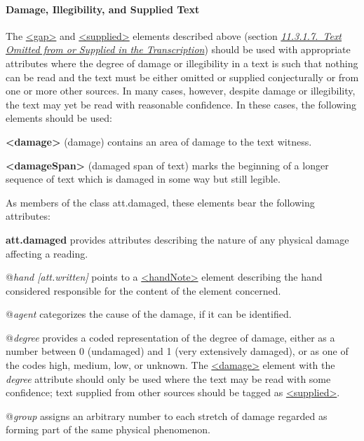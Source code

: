 \paragraph[{Damage, Illegibility, and Supplied Text}]{Damage, Illegibility, and Supplied Text}\label{PHDA}\par
The \hyperref[TEI.gap]{<gap>} and \hyperref[TEI.supplied]{<supplied>} elements described above (section \textit{\hyperref[PHOM]{11.3.1.7.\ Text Omitted from or Supplied in the Transcription}}) should be used with appropriate attributes where the degree of damage or illegibility in a text is such that nothing can be read and the text must be either omitted or supplied conjecturally or from one or more other sources. In many cases, however, despite damage or illegibility, the text may yet be read with reasonable confidence. In these cases, the following elements should be used: 
\begin{sansreflist}
  
\item [\textbf{<damage>}] (damage) contains an area of damage to the text witness.
\item [\textbf{<damageSpan>}] (damaged span of text) marks the beginning of a longer sequence of text which is damaged in some way but still legible.
\end{sansreflist}
 As members of the class \textsf{att.damaged}, these elements bear the following attributes: 
\begin{sansreflist}
  
\item [\textbf{att.damaged}] provides attributes describing the nature of any physical damage affecting a reading.\hfil\\[-10pt]\begin{sansreflist}
    \item[@{\itshape hand [att.written]}]
  points to a \hyperref[TEI.handNote]{<handNote>} element describing the hand considered responsible for the content of the element concerned.
    \item[@{\itshape agent}]
  categorizes the cause of the damage, if it can be identified.
    \item[@{\itshape degree}]
  provides a coded representation of the degree of damage, either as a number between 0 (undamaged) and 1 (very extensively damaged), or as one of the codes high, medium, low, or unknown. The \hyperref[TEI.damage]{<damage>} element with the {\itshape degree} attribute should only be used where the text may be read with some confidence; text supplied from other sources should be tagged as \hyperref[TEI.supplied]{<supplied>}.
    \item[@{\itshape group}]
  assigns an arbitrary number to each stretch of damage regarded as forming part of the same physical phenomenon.
\end{sansreflist}  
\end{sansreflist}
